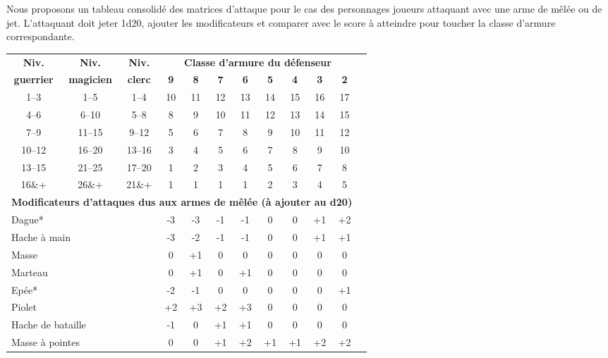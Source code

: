 \bigskip

Nous proposons un tableau consolidé des matrices d'attaque pour le cas des personnages joueurs attaquant avec une arme de mêlée ou de jet. L'attaquant doit jeter 1d20, ajouter les modificateurs et comparer avec le score à atteindre pour toucher la classe d'armure correspondante.

\bigskip

\begin{tabular}{cccccccccccc}
\textbf{Niv. } & \textbf{Niv.} & \textbf{Niv.} & \multicolumn{8}{c}{\textbf{Classe d'armure du défenseur}} \\
\textbf{guerrier}   & \textbf{magicien}   & \textbf{clerc}   & \textbf{9} & \textbf{8} & \textbf{7} & \textbf{6} & \textbf{5} & \textbf{4} & \textbf{3} & \textbf{2} \\
1--3   & 1--5   & 1--4   & 10 & 11 & 12 & 13 & 14 & 15 & 16 & 17 \\
4--6   & 6--10  & 5--8   &  8 &  9 & 10 & 11 & 12 & 13 & 14 & 15 \\
7--9   & 11--15 & 9--12  &  5 &  6 &  7 &  8 &  9 & 10 & 11 & 12 \\
10--12 & 16--20 & 13--16 &  3 &  4 &  5 &  6 &  7 &  8 &  9 & 10 \\
13--15 & 21--25 & 17--20 &  1 &  2 &  3 &  4 &  5 &  6 &  7 &  8 \\
16\&+  & 26\&+  & 21\&+  &  1 &  1 &  1 &  1 &  2 &  3 &  4 &  5 \\
\multicolumn{11}{l}{\textbf{Modificateurs d'attaques dus aux armes de mêlée (à ajouter au d20)}} \\
\multicolumn{3}{l}{Dague*}            & -3 & -3 & -1 & -1 &  0 &  0 & +1 & +2 \\
\multicolumn{3}{l}{Hache à main}      & -3 & -2 & -1 & -1 &  0 &  0 & +1 & +1 \\
\multicolumn{3}{l}{Masse}             &  0 & +1 &  0 &  0 &  0 &  0 &  0 &  0 \\
\multicolumn{3}{l}{Marteau}           &  0 & +1 &  0 & +1 &  0 &  0 &  0 &  0 \\
\multicolumn{3}{l}{Epée*}             & -2 & -1 &  0 &  0 &  0 &  0 &  0 & +1 \\
\multicolumn{3}{l}{Piolet}            & +2 & +3 & +2 & +3 &  0 &  0 &  0 &  0 \\
\multicolumn{3}{l}{Hache de bataille} & -1 &  0 & +1 & +1 &  0 &  0 &  0 &  0 \\
\multicolumn{3}{l}{Masse à pointes}   &  0 &  0 & +1 & +2 & +1 & +1 & +2 & +2 \\

\end{tabular}
